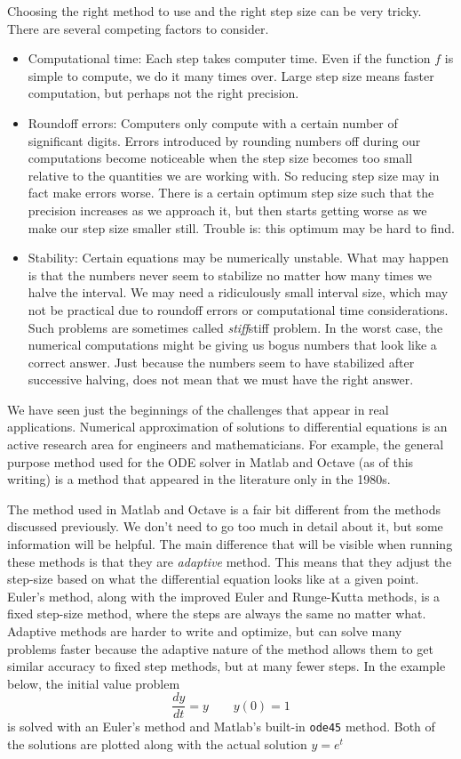 \documentclass{ximera}
\begin{document}
Choosing the right method to use and the right step size can be very tricky. There are several competing factors to consider.
\begin{itemize}
    \item Computational time:  Each step takes computer time.  Even if the function $f$ is simple to compute, we do it many times over. Large step size means faster computation, but perhaps not the right precision.
    \item Roundoff errors: Computers only compute with a certain number of significant digits.  Errors introduced by rounding numbers off during our computations become noticeable when the step size becomes too small relative to the quantities we are working with. So reducing step size may in fact make errors worse. There is a certain optimum step size such that the precision increases as we approach it, but then starts getting worse as we make our step size smaller still.  Trouble is: this optimum may be hard to find.
    \item Stability: Certain equations may be numerically unstable.  What may happen is that the numbers never seem to stabilize no matter how many times we halve the interval.  We may need a ridiculously small interval size, which may not be practical due to roundoff errors or computational time considerations.  Such problems are sometimes called \emph{stiff}stiff problem. In the worst case, the numerical computations might be giving us bogus numbers that look like a correct answer.  Just because the numbers seem to have stabilized after successive halving, does not mean that we must have the right answer.
\end{itemize}

We have seen just the beginnings of the challenges that appear in real applications.  Numerical approximation of solutions to differential equations is an active research area for engineers and mathematicians.  For example, the general purpose method used for the ODE solver in Matlab and Octave (as of this writing) is a method that appeared in the literature only in the 1980s.

The method used in Matlab and Octave is a fair bit different from the methods discussed previously. We don't need to go too much in detail about it, but  some information will be helpful. The main difference that will be visible when running these methods is that they are \emph{adaptive} method. This means that they adjust the step-size based on what the differential equation looks like at a given point. Euler's method, along with the improved Euler and Runge-Kutta methods, is a fixed step-size method, where the steps are always the same no matter what. Adaptive methods are harder to write and optimize, but can solve many problems faster because the adaptive nature of the method allows them to get similar accuracy to fixed step methods, but at many fewer steps. In the example below, the initial value problem
\begin{equation*}
    \frac{dy}{dt} = y \qquad y(0) = 1
\end{equation*}
is solved with an Euler's method and Matlab's built-in \texttt{ode45} method. Both of the solutions are plotted along with the actual solution $y = e^t$
\end{document}
